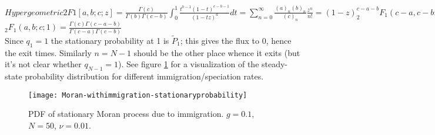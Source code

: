 $Hypergeometric2F1[a,b;c;z] = \frac{\Gamma(c)}{\Gamma(b)\Gamma(c-b)} \int_0^1 \frac{t^{b-1}(1-t)^{c-b-1}}{(1-t z)^{a}}dt = \sum_{n=0}^\infty \frac{(a)_n (b)_n}{(c)_n}\frac{z^n}{n!} = (1-z)^{c-a-b} _{2}F_1(c-a,c-b;c;z)$ \\
$_2F_1(a,b;c;1) = \frac{\Gamma(c)\Gamma(c-a-b)}{\Gamma(c-a)\Gamma(c-b)}$ \\
Since $q_1=1$ the stationary probability at 1 is $\widetilde{P}_1$; this gives the flux to 0, hence the exit times. 
Similarly $n=N-1$ should be the other place whence it exits (but it's not clear whether $q_{N-1}=1$). 
See figure \ref{stationary-fig} for a visualization of the steady-state probability distribution for different immigration/speciation rates. 
\begin{figure}[ht]
	\centering
	\texttt{[image: Moran-withimmigration-stationaryprobability]}
	\caption{PDF of stationary Moran process due to immigration. $g=0.1$, $N=50$, $\nu=0.01$. } \label{stationary-fig}
\end{figure}

